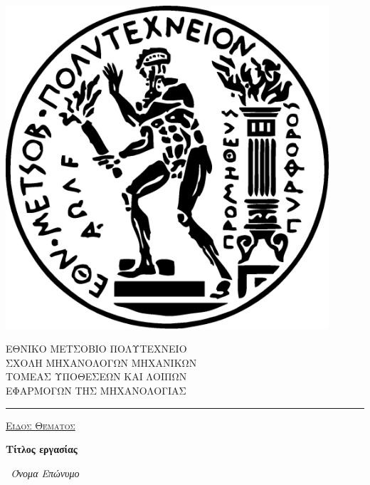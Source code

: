 \begin{titlepage}
	\begin{center}
		\begin{minipage}{0.15\textwidth}%
			\includegraphics[width=0.9\textwidth]{./logo/pyrforos.eps}%
		\end{minipage}\hspace{10pt}
		\begin{minipage}{0.6\textwidth}%
			ΕΘΝΙΚΟ ΜΕΤΣΟΒΙΟ ΠΟΛΥΤΕΧΝΕΙΟ\\
			ΣΧΟΛΗ ΜΗΧΑΝΟΛΟΓΩΝ ΜΗΧΑΝΙΚΩΝ\\
			ΤΟΜΕΑΣ ΥΠΟΘΕΣΕΩΝ ΚΑΙ ΛΟΙΠΩΝ\\
			ΕΦΑΡΜΟΓΩΝ ΤΗΣ ΜΗΧΑΝΟΛΟΓΙΑΣ\\
		\end{minipage}%
	\end{center}

	\par\noindent\rule{\textwidth}{0.8pt}

	\vspace{1cm}
	{\centering

		{\scshape\Large \underline{Είδος Θέματος}\par}
		\vspace{1.5cm}
		{\huge\bfseries Τίτλος εργασίας\par}
		\vspace{2cm}
		{\Large\itshape~Όνομα Επώνυμο\/\par}

}
\end{titlepage}
